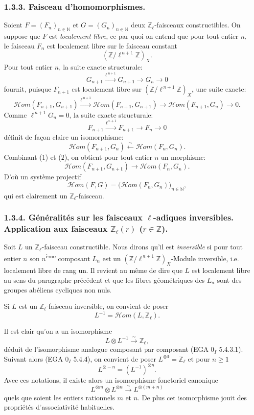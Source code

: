 \documentclass[11pt]{article}
\providecommand{\cHom}{\mathcal{H}om}
\begin{document}
\subsubsection*{1.3.3. Faisceau d'homomorphismes.}

Soient \(F=(F_n)_{n\in\mathbb N}\) et \(G=(G_n)_{n\in\mathbb N}\) deux \(\mathbb Z_\ell\)-faisceaux constructibles. On suppose que \(F\) est \emph{localement libre}, ce par quoi on entend que pour tout entier \(n\), le faisceau \(F_n\) est localement libre sur le faisceau constant
\[
(\mathbb Z/\ell^{\,n+1}\mathbb Z)_X.
\]
Pour tout entier \(n\), la suite exacte structurale:
\[
G_{n+1}\xrightarrow{\ell^{\,n+1}}G_{n+1}\longrightarrow G_n\longrightarrow 0
\]
fournit, puisque \(F_{n+1}\) est localement libre sur \((\mathbb Z/\ell^{\,n+1}\mathbb Z)_X\), une suite exacte:
\[
\cHom(F_{n+1},G_{n+1})
 \xrightarrow{\ell^{\,n+1}}
\cHom(F_{n+1},G_{n+1})
 \longrightarrow
\cHom(F_{n+1},G_n)
 \longrightarrow 0.
\tag{1}
\]
Comme \(\ell^{\,n+1}G_n=0\), la suite exacte structurale:
\[
F_{n+1}\xrightarrow{\ell^{\,n+1}}F_{n+1}\longrightarrow F_n\longrightarrow 0
\]
définit de façon claire un isomorphisme:
\[
\cHom(F_{n+1},G_n)\xleftarrow{\sim}\cHom(F_n,G_n).
\tag{2}
\]
Combinant (1) et (2), on obtient pour tout entier \(n\) un morphisme:
\[
\cHom(F_{n+1},G_{n+1})\longrightarrow \cHom(F_n,G_n).
\]
D'où un système projectif
\[
\cHom(F,G)=\bigl(\cHom(F_n,G_n)\bigr)_{n\in\mathbb N},
\]
qui est clairement un \(\mathbb Z_\ell\)-faisceau.

\subsubsection*{1.3.4. Généralités sur les faisceaux \(\ell\)-adiques inversibles. Application aux faisceaux \(\mathbb Z_\ell(r)\) (\(r\in\mathbb Z\)).}

Soit \(L\) un \(\mathbb Z_\ell\)-faisceau constructible. Nous dirons qu'il est \emph{inversible} si pour tout entier \(n\) son \(n\)\textsuperscript{ème} composant \(L_n\) est un \((\mathbb Z/\ell^{\,n+1}\mathbb Z)_X\)-Module inversible, i.e. localement libre de rang un. Il revient au même de dire que \(L\) est localement libre au sens du paragraphe précédent et que les fibres géométriques des \(L_n\) sont des groupes abéliens cycliques non nuls.

Si \(L\) est un \(\mathbb Z_\ell\)-faisceau inversible, on convient de poser
\[
L^{-1}=\cHom(L,\mathbb Z_\ell).
\]

Il est clair qu'on a un isomorphisme
\[
L\otimes L^{-1}\xrightarrow{\sim}\mathbb Z_\ell,
\]
déduit de l'isomorphisme analogue composant par composant (EGA \(0_I\) 5.4.3.1). Suivant alors (EGA \(0_I\) 5.4.4), on convient de poser \(L^{\otimes0}=\mathbb Z_\ell\) et pour \(n\ge1\)
\[
L^{\otimes -n}=(L^{-1})^{\otimes n}.
\]
Avec ces notations, il existe alors un isomorphisme fonctoriel canonique
\[
L^{\otimes m}\otimes L^{\otimes n}\xrightarrow{\sim}L^{\otimes(m+n)}
\]
quels que soient les entiers rationnels \(m\) et \(n\). De plus cet isomorphisme
jouit 
des propriétés d'associativité habituelles.
\end{document}
